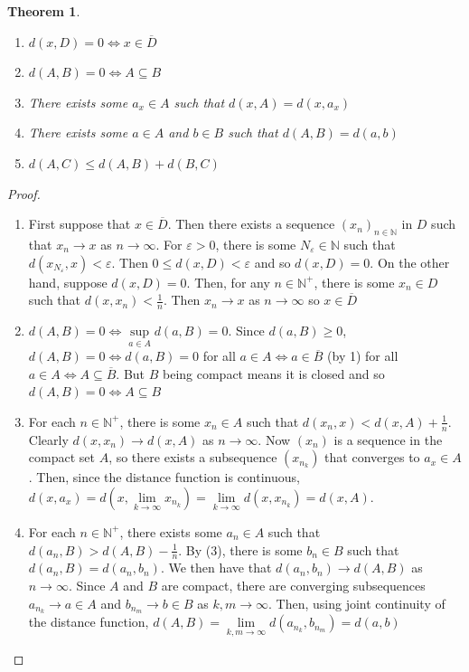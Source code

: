 \documentclass{article}
\theoremstyle{plain}
\newtheorem{thm}{Theorem}[section]
\theoremstyle{definition}
\theoremstyle{remark}
\begin{document}
\begin{thm}\label{thm:d_properties}
    \begin{enumerate}
        For $A,B,C \in \mathcal{K}(X)$,  any set $D\subseteq X$ and $x \in X$
        \item $d(x,D)=0 \iff x\in \overline{D}$
        \item $d(A,B)=0 \iff A \subseteq B$
        \item There exists some $a_x \in A$ such that $d(x, A) = d(x, a_x)$
        \item There exists some $a\in A$ and $b\in B$ such that $d(A,B)=d(a,b)$
        \item $d(A,C) \le d(A,B) + d(B,C)$
    \end{enumerate}
\end{thm}

\begin{proof} $ $
    \begin{enumerate} 
        \item First suppose that $x \in \overline{D}$. Then there exists a sequence $(x_n)_{n\in \mathbb{N}}$ in $D$ such that $x_n \to x$ as $n\to \infty$. For $\varepsilon>0$, there is some $N_\varepsilon \in \mathbb{N}$ such that $d(x_{N_\varepsilon}, x) < \varepsilon$. Then $0 \le d(x,D) < \varepsilon$ and so $d(x, D)=0$. On the other hand, suppose $d(x,D) = 0$. Then, for any $n\in \mathbb{N}^+$, there is some $x_n \in D$ such that $d(x,x_n)< \frac{1}{n}$. Then $x_n \to x$ as $n \to \infty$ so $x \in \overline{D}$
        \item $d(A,B) = 0 \iff \sup \limits _{a \in A}  d(a,B) = 0$. Since $d(a,B) \ge 0$, $d(A,B)=0\iff d(a,B)=0 $ for all $ a \in A \iff a \in \overline{B}$ (by 1) for all $a \in A \iff A \subseteq \overline{B}$. But $B$ being compact means it is closed and so $d(A,B)=0 \iff A\subseteq B$
        \item For each $n\in \mathbb{N}^+$, there is some $x_n \in A$ such that $d(x_n, x)<d(x,A) + \frac{1}{n}$. Clearly $d(x, x_n) \to d(x,A)$ as $n\to \infty$. Now $(x_n)$ is a sequence in the compact set $A$, so there exists a subsequence $(x_{n_k})$ that converges to $a_x \in A$. Then, since the distance function is continuous, $d(x, a_x) = d \left (x, \lim \limits _{k\to \infty}x_{n_k} \right ) = \lim \limits _{k \to \infty}d(x,x_{n_k})=d(x,A)$.
        \item For each $n \in \mathbb{N}^+$, there exists some $a_n \in A$ such that $d(a_n, B)>d(A,B)-\frac{1}{n}$. By (3), there is some $b_n \in B$ such that $d(a_n, B) = d(a_n, b_n)$. We then have that $d(a_n, b_n) \to d(A,B)$ as $n \to \infty$. Since $A$ and $B$ are compact, there are converging subsequences $a_{n_k} \to a \in A$ and $b_{n_m} \to b \in B$ as $k,m \to \infty$. Then, using joint continuity of the distance function, $d(A,B) = \lim \limits _{k,m \to \infty}d(a_{n_k}, b_{n_m}) = d(a,b)$


\end{enumerate}
\end{proof}
\end{document}
